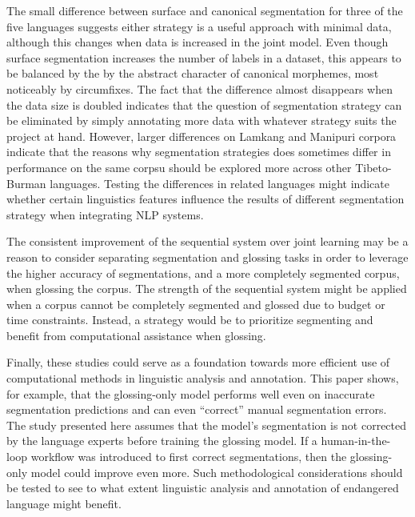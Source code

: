 The small difference between surface and canonical segmentation for three of the five languages suggests either strategy is a useful approach with minimal data, although this changes when data is increased in the joint model. Even though surface segmentation increases the number of labels in a dataset, this appears to be balanced by the by the abstract character of canonical morphemes, most noticeably by circumfixes. The fact that the difference almost disappears when the data size is doubled indicates that the question of segmentation strategy can be eliminated by simply annotating more data with whatever strategy suits the project at hand. 
However, larger differences on Lamkang and Manipuri corpora indicate that the reasons why segmentation strategies does sometimes differ in performance on the same corpsu should be explored more across other Tibeto-Burman languages. Testing the differences in related languages might indicate whether certain linguistics features influence the results of different segmentation strategy when integrating NLP systems. 

The consistent improvement of the sequential system over joint learning may be a reason to consider separating segmentation and glossing tasks in order to leverage the higher accuracy of segmentations, and a more completely segmented corpus, when glossing the corpus. 
The strength of the sequential system might be applied when a corpus cannot be completely segmented and glossed due to budget or time constraints. Instead, a strategy would be to prioritize segmenting and benefit from computational assistance when glossing. 

Finally, these studies could serve as a foundation towards more efficient use of computational methods in linguistic analysis and annotation. This paper shows, for example, that the glossing-only model performs well even on inaccurate segmentation predictions and can even ``correct'' manual segmentation errors. The study presented here assumes that the model's segmentation is not corrected by the language experts before training the glossing model. If a human-in-the-loop workflow was introduced to first correct segmentations, then the glossing-only model could improve even more. Such methodological considerations should be tested to see to what extent linguistic analysis and annotation of endangered language might benefit.

